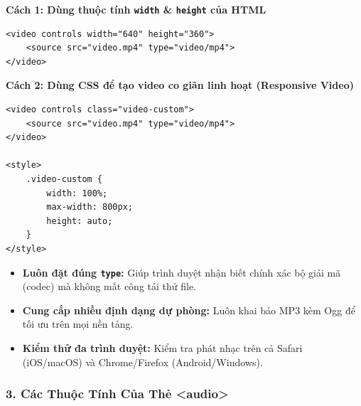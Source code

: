 \documentclass[11pt,oneside]{book}
\newcommand{\codeinline}[1]{\textcolor{accentOrange}{\texttt{#1}}}
\begin{document}
\textbf{Cách 1: Dùng thuộc tính \codeinline{width} \& \codeinline{height} của HTML}
\begin{codeWindow}
\begin{lstlisting}[language=HTML5]
<video controls width="640" height="360">
    <source src="video.mp4" type="video/mp4">
</video>
\end{lstlisting}
\end{codeWindow}
\textbf{Cách 2: Dùng CSS để tạo video co giãn linh hoạt (Responsive Video)}
\begin{codeWindow}
\begin{lstlisting}[language=HTML5]
<video controls class="video-custom">
    <source src="video.mp4" type="video/mp4">
</video>

<style>
    .video-custom {
        width: 100%;
        max-width: 800px;
        height: auto;
    }
</style>
\end{lstlisting}
\end{codeWindow}

\begin{tipBox}
\begin{itemize}[leftmargin=1.5em, itemsep=2pt, parsep=0pt]
    \item \textbf{Luôn đặt đúng \codeinline{type}:} Giúp trình duyệt nhận biết chính xác bộ giải mã (codec) mà không mất công tải thử file.
    \item \textbf{Cung cấp nhiều định dạng dự phòng:} Luôn khai báo MP3 kèm Ogg để tối ưu trên mọi nền tảng.
    \item \textbf{Kiểm thử đa trình duyệt:} Kiểm tra phát nhạc trên cả Safari (iOS/macOS) và Chrome/Firefox (Android/Windows).
\end{itemize}
\end{tipBox}

\subsubsection{3. Các Thuộc Tính Của Thẻ <audio>}
\end{document}
